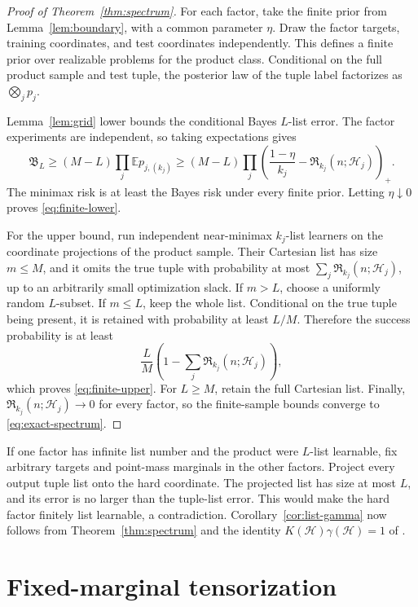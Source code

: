 \documentclass{article}
\theoremstyle{definition}
\theoremstyle{remark}
\newcommand{\E}{\mathbb E}
\newcommand{\cH}{\mathcal H}
\newcommand{\Risk}{\mathfrak R}
\newcommand{\Bayes}{\mathfrak B}
\newcommand{\1}{\mathbf 1}
\begin{document}
\begin{proof}[Proof of Theorem~\ref{thm:spectrum}]
For each factor, take the finite prior from Lemma~\ref{lem:boundary}, with a common parameter \(\eta\). Draw the factor targets, training coordinates, and test coordinates independently. This defines a finite prior over realizable problems for the product class. Conditional on the full product sample and test tuple, the posterior law of the tuple label factorizes as \(\bigotimes_jp_j\).

Lemma~\ref{lem:grid} lower bounds the conditional Bayes \(L\)-list error. The factor experiments are independent, so taking expectations gives \[ \Bayes_L\ge(M-L)\prod_j\E p_{j,(k_j)} \ge(M-L)\prod_j\left(\frac{1-\eta}{k_j}-\Risk_{k_j}(n;\cH_j)\right)_+. \] The minimax risk is at least the Bayes risk under every finite prior. Letting \(\eta\downarrow0\) proves \eqref{eq:finite-lower}.

For the upper bound, run independent near-minimax \(k_j\)-list learners on the coordinate projections of the product sample. Their Cartesian list has size \(m\le M\), and it omits the true tuple with probability at most \(\sum_j\Risk_{k_j}(n;\cH_j)\), up to an arbitrarily small optimization slack. If \(m>L\), choose a uniformly random \(L\)-subset. If \(m\le L\), keep the whole list. Conditional on the true tuple being present, it is retained with probability at least \(L/M\). Therefore the success probability is at least \[ \frac{L}{M}\left(1-\sum_j\Risk_{k_j}(n;\cH_j)\right), \] which proves \eqref{eq:finite-upper}. For \(L\ge M\), retain the full Cartesian list. Finally, \(\Risk_{k_j}(n;\cH_j)\to0\) for every factor, so the finite-sample bounds converge to \eqref{eq:exact-spectrum}.
\end{proof}

If one factor has infinite list number and the product were \(L\)-list learnable, fix arbitrary targets and point-mass marginals in the other factors. Project every output tuple list onto the hard coordinate. The projected list has size at most \(L\), and its error is no larger than the tuple-list error. This would make the hard factor finitely list learnable, a contradiction. Corollary~\ref{cor:list-gamma} now follows from Theorem~\ref{thm:spectrum} and the identity \(K(\cH)\gamma(\cH)=1\) of \citet{brukhim2023boosting}.

\section{Fixed-marginal tensorization}
\label{sec:fixed}
\end{document}
